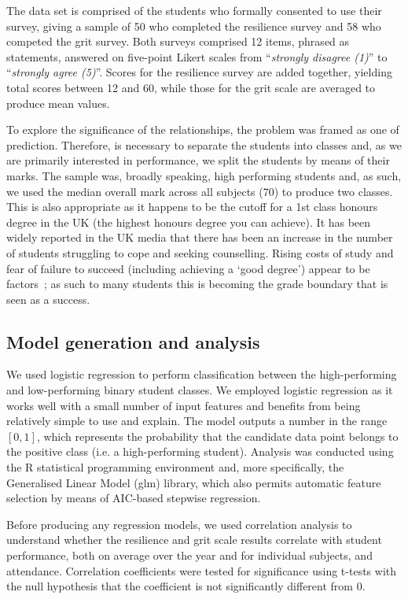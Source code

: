 \documentclass[sigconf]{acmart}
\begin{document}
The data set is comprised of the students who formally consented to use their survey, giving a sample of 50 who completed the resilience survey and 58 who competed the grit survey. Both surveys comprised 12 items, phrased as statements, answered on five-point Likert scales from ``{\emph{strongly disagree (1)}}'' to ``{\emph{strongly agree (5)}}''. Scores for the resilience survey are added together, yielding total scores between 12 and 60, while those for the grit scale are averaged to produce mean values.

To explore the significance of the relationships, the problem was framed as one of prediction. Therefore, is necessary to separate the students into classes and, as we are primarily interested in performance, we split the students by means of their marks. The sample was, broadly speaking, high performing students and, as such, we used the median overall mark across all subjects (70) to produce two classes. This is also appropriate as it happens to be the cutoff for a 1st class honours degree in the UK (the highest honours degree you can achieve). It has been widely reported in the UK media that there has been an increase in the number of students struggling to cope and seeking counselling. Rising costs of study and fear of failure to succeed (including achieving a `good degree') appear to be factors~\cite{BBC}; as such to many students this is becoming the grade boundary that is seen as a success.

\subsection{Model generation and analysis}
We used logistic regression to perform classification between the high-performing and low-performing binary student classes. We employed logistic regression as it works well with a small number of input features and benefits from being relatively simple to use and explain. The model outputs a number in the range $[0,1]$, which represents the probability that the candidate data point belongs to the positive class (i.e. a high-performing student). Analysis was conducted using the R statistical programming environment and, more specifically, the Generalised Linear Model (glm) library, which also permits automatic feature selection by means of AIC-based stepwise regression.

Before producing any regression models, we used correlation analysis to understand whether the resilience and grit scale results correlate with student performance, both on average over the year and for individual subjects, and attendance. Correlation coefficients were tested for significance using t-tests with the null hypothesis that the coefficient is not significantly different from 0. 
\end{document}
